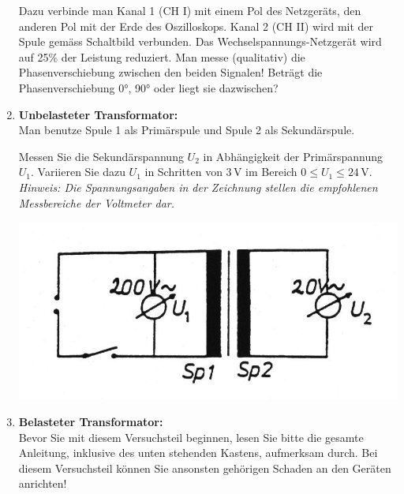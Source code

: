 \begin{enumerate}
		Dazu verbinde man Kanal 1 (CH I) mit einem Pol des Netzgeräts, den anderen Pol mit der Erde des Oszilloskops. Kanal 2 (CH II) wird mit der Spule gemäss Schaltbild verbunden. Das Wechselspannungs-Netzgerät wird auf 25\% 
		der Leistung reduziert. Man messe (qualitativ) die Phasenverschiebung zwischen den beiden Signalen! Beträgt die Phasenverschiebung 0°, 90° oder liegt sie dazwischen?
	\item \textbf{Unbelasteter Transformator:}\\ 
		Man benutze Spule 1 als Primärspule und Spule 2 als Sekundärspule.\\
		\begin{minipage}{0.55\textwidth}
			Messen Sie die Sekundärspannung $U_2$ in Abhängigkeit der Primärspannung $U_1$. Variieren Sie dazu $U_1$ in Schritten von 3\,V im Bereich $0\leq U_1\leq 24$\,V.\\
			\textit{Hinweis: Die Spannungsangaben in der Zeichnung stellen die empfohlenen Messbereiche der Voltmeter dar.}
		\end{minipage}
		\begin{minipage}{0.45\textwidth}
			\includegraphics[width=\textwidth]{Versuch_15-16/Abbildungen/BILD20.jpg}
			\label{fig:Bild20}
		\end{minipage}
	\item \textbf{Belasteter Transformator:}\\
	Bevor Sie mit diesem Versuchsteil beginnen, lesen Sie bitte die gesamte Anleitung, inklusive des unten stehenden Kastens, aufmerksam durch. Bei diesem Versuchsteil können Sie ansonsten gehörigen Schaden an den Geräten anrichten!\\
	

\end{enumerate}
